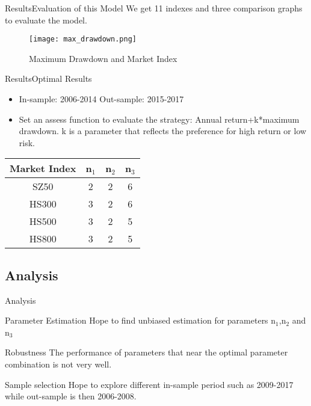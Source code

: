 \documentclass{beamer}
\begin{document}
\begin{frame}{Results}{Evaluation of this Model}
We get 11 indexes and three comparison graphs to evaluate the model.
\begin{figure}
\centering
\texttt{[image: max\_drawdown.png]}
\caption{Maximum Drawdown and Market Index}
\label{fig:graph}
\end{figure}
\end{frame}

\begin{frame}{Results}{Optimal Results}
\small
\begin{itemize}
  \item{
     In-sample: 2006-2014
	 Out-sample: 2015-2017
	 \pause
  }
  \item{
     Set an assess function to evaluate the strategy: Annual return+k*maximum drawdown.
	 k is a parameter that reflects the preference for high return or low risk.
	 \pause
  }
  \end{itemize}
  \begin{tabular}{*{4}{c}}
  \toprule
  Market Index & n$_1$ & n$_2$ & n$_3$\\
  \midrule
  SZ50 & 2 & 2 & 6\\
  HS300 & 3 & 2 & 6\\
  HS500 & 3 & 2 & 5\\
  HS800 & 3 & 2 & 5\\
  \bottomrule
  \end{tabular}
\end{frame}

\subsection{Analysis}
\begin{frame}{Analysis}
\begin{block}{Parameter Estimation}
Hope to find unbiased estimation for parameters n$_1$,n$_2$ and n$_3$
\pause
\end{block}
\begin{block}{Robustness}
The performance of parameters that near the optimal parameter combination is not very well.
\pause
\end{block}
\begin{block}{Sample selection}
Hope to explore different in-sample period such as 2009-2017 while out-sample is then 2006-2008.
\pause
\end{block}
\end{frame}
\end{document}
